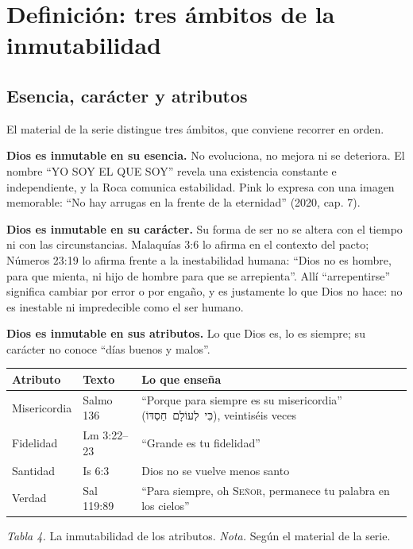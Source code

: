 \documentclass[11pt,letterpaper]{article}
\newcommand{\heb}[1]{\mbox{\foreignlanguage{hebrew}{#1}}}
\newcommand{\SENOR}{\textsc{Señor}}
\begin{document}
\section{Definición: tres ámbitos de la inmutabilidad}

\subsection{Esencia, carácter y atributos}
El material de la serie distingue tres ámbitos, que conviene recorrer en orden.

\textbf{Dios es inmutable en su esencia.} No evoluciona, no mejora ni se deteriora. El nombre ``YO SOY EL QUE SOY'' revela una existencia constante e independiente, y la Roca comunica estabilidad. Pink lo expresa con una imagen memorable: ``No hay arrugas en la frente de la eternidad'' (2020, cap. 7).

\textbf{Dios es inmutable en su carácter.} Su forma de ser no se altera con el tiempo ni con las circunstancias. Malaquías 3:6 lo afirma en el contexto del pacto; Números 23:19 lo afirma frente a la inestabilidad humana: ``Dios no es hombre, para que mienta, ni hijo de hombre para que se arrepienta''. Allí ``arrepentirse'' significa cambiar por error o por engaño, y es justamente lo que Dios no hace: no es inestable ni impredecible como el ser humano.

\textbf{Dios es inmutable en sus atributos.} Lo que Dios es, lo es siempre; su carácter no conoce ``días buenos y malos''.

\begin{center}\small\renewcommand{\arraystretch}{1.18}
\begin{tabular}{@{}L{2.6cm}L{3.2cm}L{8.0cm}@{}}
\toprule
\textbf{Atributo} & \textbf{Texto} & \textbf{Lo que enseña} \\ \midrule
Misericordia & Salmo 136 & ``Porque para siempre es su misericordia'' (\heb{כִּי לְעוֹלָם חַסְדּוֹ}), veintiséis veces \\
Fidelidad & Lm 3:22--23 & ``Grande es tu fidelidad'' \\
Santidad & Is 6:3 & Dios no se vuelve menos santo \\
Verdad & Sal 119:89 & ``Para siempre, oh \SENOR, permanece tu palabra en los cielos'' \\
\bottomrule
\end{tabular}\par
{\footnotesize\color{gris}\textit{Tabla 4.} La inmutabilidad de los atributos. \textit{Nota.} Según el material de la serie.}
\end{center}
\end{document}
